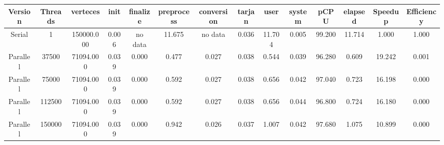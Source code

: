 \begin{tabular}{|c|c|c|c|c|c|c|c|c|c|c|c|c|c|}
\toprule
 Version &  Threads &   verteces &  init & finalize &  preprocess & conversion &  tarjan &   user &  system &   pCPU &  elapsed &  Speedup &  Efficiency \\
\midrule
  Serial &        1 & 150000.000 & 0.006 &  no data &      11.675 &    no data &   0.036 & 11.704 &   0.005 & 99.200 &   11.714 &    1.000 &       1.000 \\
Parallel &    37500 &  71094.000 & 0.039 &    0.000 &       0.477 &      0.027 &   0.038 &  0.544 &   0.039 & 96.280 &    0.609 &   19.242 &       0.001 \\
Parallel &    75000 &  71094.000 & 0.039 &    0.000 &       0.592 &      0.027 &   0.038 &  0.656 &   0.042 & 97.040 &    0.723 &   16.198 &       0.000 \\
Parallel &   112500 &  71094.000 & 0.039 &    0.000 &       0.592 &      0.027 &   0.038 &  0.656 &   0.044 & 96.800 &    0.724 &   16.180 &       0.000 \\
Parallel &   150000 &  71094.000 & 0.039 &    0.000 &       0.942 &      0.026 &   0.037 &  1.007 &   0.042 & 97.680 &    1.075 &   10.899 &       0.000 \\
\bottomrule
\end{tabular}
